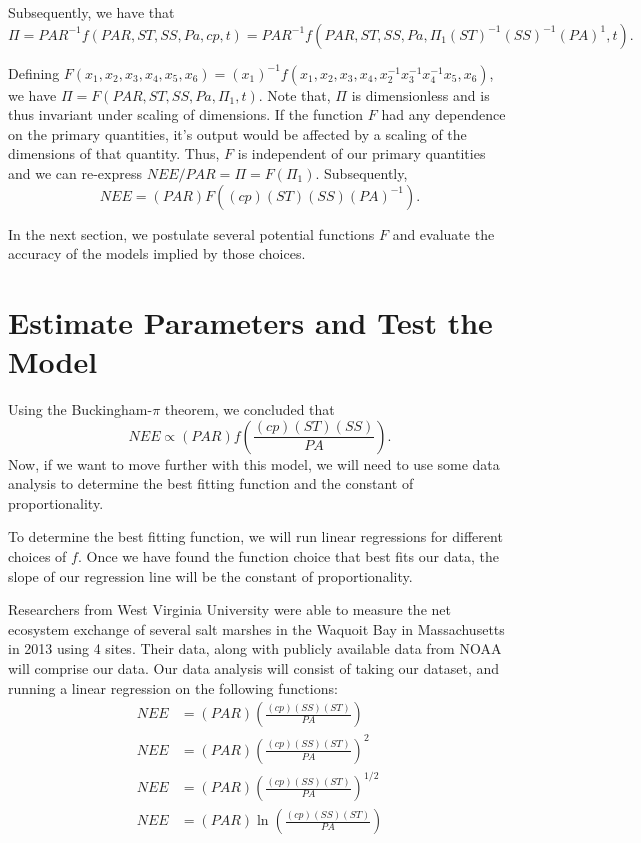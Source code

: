 \documentclass{article}
\begin{document}
Subsequently, we have that 
$$\Pi = PAR^{-1} f(PAR, ST,SS, Pa,cp,t) =  PAR^{-1}f(PAR,ST,SS,Pa,\Pi_1(ST)^{-1}(SS)^{-1}(PA)^{1},t).$$

Defining $F(x_1,x_2,x_3,x_4,x_5,x_6) = (x_1)^{-1}f(x_1,x_2,x_3,x_4, x_2^{-1}x_3^{-1}x_4^{-1}x_5,x_6)$, we have $\Pi = F(PAR, ST, SS, Pa, \Pi_1, t)$. Note that, $\Pi$ is dimensionless and is thus invariant under scaling of dimensions. If the function $F$ had any dependence on the primary quantities, it's output would be affected by a scaling of the dimensions of that quantity. Thus, $F$ is independent of our primary quantities and we can re-express $NEE/PAR = \Pi = F(\Pi_1)$. Subsequently, $$NEE = (PAR) F((cp)(ST)(SS)(PA)^{-1}).$$\medskip

In the next section, we postulate several potential functions $F$ and evaluate the accuracy of the models implied by those choices.\\

\section{Estimate Parameters and Test the Model}
Using the Buckingham-$\pi$ theorem, we concluded that
$$NEE \propto \left(PAR\right)f\left( \frac{\left(cp\right)\left( ST\right) \left(SS\right)}{PA} \right).$$
Now, if we want to move further with this model, we will need to use some data analysis to determine the best fitting function and the constant of proportionality. \medskip

To determine the best fitting function, we will run linear regressions for different choices of $f$. Once we have found the function choice that best fits our data, the slope of our regression line will be the constant of proportionality. \medskip

Researchers from West Virginia University were able to measure the net ecosystem exchange of several salt marshes in the Waquoit Bay in Massachusetts in 2013 using 4 sites.  Their data, along with publicly available data from NOAA will comprise our data. Our data analysis will consist of taking our dataset, and running a linear regression on the following functions:
\begin{align*}
    NEE &= \left(PAR\right)\left(\frac{(cp)(SS)(ST)}{PA}\right) \\
    NEE &= \left(PAR\right)\left(\frac{(cp)(SS)(ST)}{PA}\right)^2 \\
    NEE &= \left(PAR\right)\left(\frac{(cp)(SS)(ST)}{PA}\right)^{1/2} \\
    NEE &= \left(PAR\right)\ln\left(\frac{(cp)(SS)(ST)}{PA}\right)
\end{align*}
\end{document}
